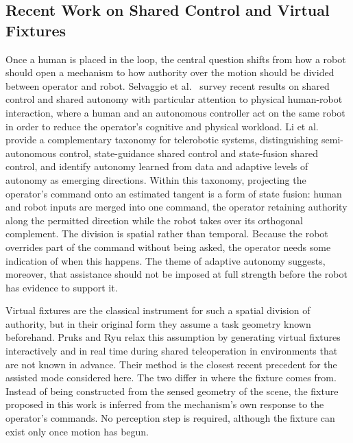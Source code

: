 \documentclass[11pt,letterpaper]{article}
\begin{document}
\subsection{Recent Work on Shared Control and Virtual Fixtures}
\label{sec:recent-shared}

Once a human is placed in the loop, the central question shifts from how a robot should open a mechanism to how authority over the motion should be divided between operator and robot. Selvaggio et al.\ \cite{selvaggio2021autonomy} survey recent results on shared control and shared autonomy with particular attention to physical human-robot interaction, where a human and an autonomous controller act on the same robot in order to reduce the operator's cognitive and physical workload. Li et al.\ \cite{li2023classification} provide a complementary taxonomy for telerobotic systems, distinguishing semi-autonomous control, state-guidance shared control and state-fusion shared control, and identify autonomy learned from data and adaptive levels of autonomy as emerging directions. Within this taxonomy, projecting the operator's command onto an estimated tangent is a form of state fusion: human and robot inputs are merged into one command, the operator retaining authority along the permitted direction while the robot takes over its orthogonal complement. The division is spatial rather than temporal. Because the robot overrides part of the command without being asked, the operator needs some indication of when this happens. The theme of adaptive autonomy suggests, moreover, that assistance should not be imposed at full strength before the robot has evidence to support it.

Virtual fixtures are the classical instrument for such a spatial division of authority, but in their original form they assume a task geometry known beforehand. Pruks and Ryu \cite{pruks2022method} relax this assumption by generating virtual fixtures interactively and in real time during shared teleoperation in environments that are not known in advance. Their method is the closest recent precedent for the assisted mode considered here. The two differ in where the fixture comes from. Instead of being constructed from the sensed geometry of the scene, the fixture proposed in this work is inferred from the mechanism's own response to the operator's commands. No perception step is required, although the fixture can exist only once motion has begun.

\end{document}
